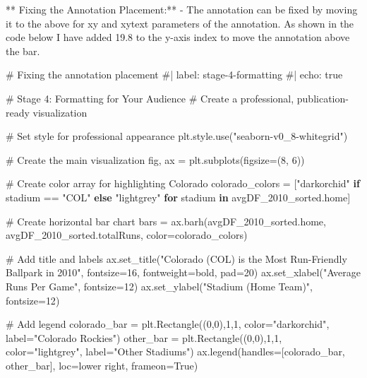\documentclass[
  letterpaper,
  DIV=11,
  numbers=noendperiod]{scrartcl}
\newenvironment{Shaded}{\begin{snugshade}}{\end{snugshade}}
\newcommand{\CommentTok}[1]{\textcolor[rgb]{0.37,0.37,0.37}{#1}}
\newcommand{\ControlFlowTok}[1]{\textcolor[rgb]{0.00,0.23,0.31}{\textbf{#1}}}
\newcommand{\DecValTok}[1]{\textcolor[rgb]{0.68,0.00,0.00}{#1}}
\newcommand{\KeywordTok}[1]{\textcolor[rgb]{0.00,0.23,0.31}{\textbf{#1}}}
\newcommand{\NormalTok}[1]{\textcolor[rgb]{0.00,0.23,0.31}{#1}}
\newcommand{\OperatorTok}[1]{\textcolor[rgb]{0.37,0.37,0.37}{#1}}
\newcommand{\StringTok}[1]{\textcolor[rgb]{0.13,0.47,0.30}{#1}}
\newcommand{\VariableTok}[1]{\textcolor[rgb]{0.07,0.07,0.07}{#1}}
\begin{document}
** Fixing the Annotation Placement:** - The annotation can be fixed by
moving it to the above for xy and xytext parameters of the annotation.
As shown in the code below I have added 19.8 to the y-axis index to move
the annotation above the bar.

\begin{Shaded}
\begin{Highlighting}[]
\CommentTok{\# Fixing the annotation placement}
\CommentTok{\#| label: stage{-}4{-}formatting}
\CommentTok{\#| echo: true}

\CommentTok{\# Stage 4: Formatting for Your Audience}
\CommentTok{\# Create a professional, publication{-}ready visualization}

\CommentTok{\# Set style for professional appearance}
\NormalTok{plt.style.use(}\StringTok{"seaborn{-}v0\_8{-}whitegrid"}\NormalTok{)}

\CommentTok{\# Create the main visualization}
\NormalTok{fig, ax }\OperatorTok{=}\NormalTok{ plt.subplots(figsize}\OperatorTok{=}\NormalTok{(}\DecValTok{8}\NormalTok{, }\DecValTok{6}\NormalTok{))}

\CommentTok{\# Create color array for highlighting Colorado}
\NormalTok{colorado\_colors }\OperatorTok{=}\NormalTok{ [}\StringTok{"darkorchid"} \ControlFlowTok{if}\NormalTok{ stadium }\OperatorTok{==} \StringTok{"COL"} \ControlFlowTok{else} \StringTok{"lightgrey"} 
                   \ControlFlowTok{for}\NormalTok{ stadium }\KeywordTok{in}\NormalTok{ avgDF\_2010\_sorted.home]}

\CommentTok{\# Create horizontal bar chart}
\NormalTok{bars }\OperatorTok{=}\NormalTok{ ax.barh(avgDF\_2010\_sorted.home, avgDF\_2010\_sorted.totalRuns, color}\OperatorTok{=}\NormalTok{colorado\_colors)}

\CommentTok{\# Add title and labels}
\NormalTok{ax.set\_title(}\StringTok{"Colorado (COL) is the Most Run{-}Friendly Ballpark in 2010"}\NormalTok{, }
\NormalTok{             fontsize}\OperatorTok{=}\DecValTok{16}\NormalTok{, fontweight}\OperatorTok{=}\StringTok{\textquotesingle{}bold\textquotesingle{}}\NormalTok{, pad}\OperatorTok{=}\DecValTok{20}\NormalTok{)}
\NormalTok{ax.set\_xlabel(}\StringTok{"Average Runs Per Game"}\NormalTok{, fontsize}\OperatorTok{=}\DecValTok{12}\NormalTok{)}
\NormalTok{ax.set\_ylabel(}\StringTok{"Stadium (Home Team)"}\NormalTok{, fontsize}\OperatorTok{=}\DecValTok{12}\NormalTok{)}

\CommentTok{\# Add legend}
\NormalTok{colorado\_bar }\OperatorTok{=}\NormalTok{ plt.Rectangle((}\DecValTok{0}\NormalTok{,}\DecValTok{0}\NormalTok{),}\DecValTok{1}\NormalTok{,}\DecValTok{1}\NormalTok{, color}\OperatorTok{=}\StringTok{"darkorchid"}\NormalTok{, label}\OperatorTok{=}\StringTok{"Colorado Rockies"}\NormalTok{)}
\NormalTok{other\_bar }\OperatorTok{=}\NormalTok{ plt.Rectangle((}\DecValTok{0}\NormalTok{,}\DecValTok{0}\NormalTok{),}\DecValTok{1}\NormalTok{,}\DecValTok{1}\NormalTok{, color}\OperatorTok{=}\StringTok{"lightgrey"}\NormalTok{, label}\OperatorTok{=}\StringTok{"Other Stadiums"}\NormalTok{)}
\NormalTok{ax.legend(handles}\OperatorTok{=}\NormalTok{[colorado\_bar, other\_bar], loc}\OperatorTok{=}\StringTok{\textquotesingle{}lower right\textquotesingle{}}\NormalTok{, frameon}\OperatorTok{=}\VariableTok{True}\NormalTok{)}


\end{Highlighting}
\end{Shaded}
\end{document}
